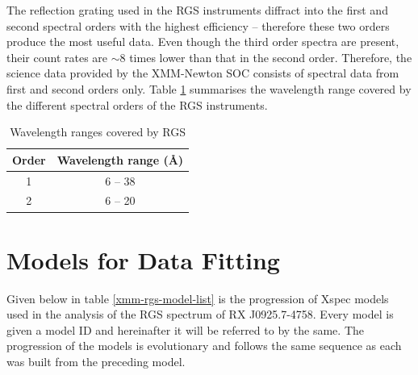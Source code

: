 		The reflection grating used in the RGS instruments diffract into the first and second spectral orders with the highest efficiency -- therefore these two orders produce the most useful data. Even though the third order spectra are present, their count rates are $\sim 8$ times lower than that in the second order. Therefore, the science data provided by the XMM-Newton SOC consists of spectral data from first and second orders only. Table \ref{xmm-rgs-wavelength} summarises the wavelength range covered by the different spectral orders of the RGS instruments.
		\begin{table}[h!]
			\centering
			\caption{Wavelength ranges covered by RGS}
			\label{xmm-rgs-wavelength}
			\begin{tabular}{|c|c|}
				\hline
				{\textbf{Order}} & {\textbf{Wavelength range (\AA)}} \\
				\hline
				{1} & {6 -- 38} \\
				\hline
				{2} & {6 -- 20} \\
				\hline
			\end{tabular}
		\end{table}
	
	\section{Models for Data Fitting} \label{hi-resolution:models}
		Given below in table \ref{xmm-rgs-model-list} is the progression of Xspec models used in the analysis of the RGS spectrum of RX J0925.7-4758. Every model is given a model ID and hereinafter it will be referred to by the same. The progression of the models is evolutionary and follows the same sequence as each was built from the preceding model.
		

